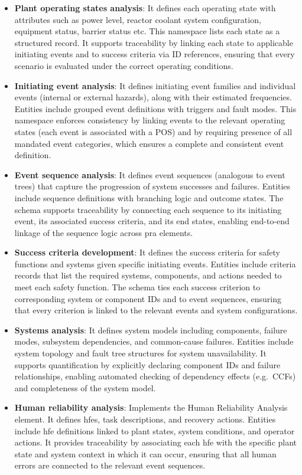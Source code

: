 \begin{itemize}
  \item \textbf{Plant operating states analysis}: It defines each operating state with attributes such as power level, reactor coolant system configuration, equipment status, barrier status etc.  This namespace lists each state as a structured record.  It supports traceability by linking each state to applicable initiating events and to success criteria via ID references, ensuring that every scenario is evaluated under the correct operating conditions.
  \item \textbf{Initiating event analysis}: It defines initiating event families and individual events (internal or external hazards), along with their estimated frequencies.  Entities include grouped event definitions with triggers and fault modes.  This namespace enforces consistency by linking events to the relevant operating states (each event is associated with a POS) and by requiring presence of all mandated event categories, which ensures a complete and consistent event definition.
  \item \textbf{Event sequence analysis}: It defines event sequences (analogous to event trees) that capture the progression of system successes and failures.  Entities include sequence definitions with branching logic and outcome states.  The schema supports traceability by connecting each sequence to its initiating event, its associated success criteria, and its end states, enabling end-to-end linkage of the sequence logic across \acrshort{pra} elements.
  \item \textbf{Success criteria development}: It defines the success criteria for safety functions and systems given specific initiating events.  Entities include criteria records that list the required systems, components, and actions needed to meet each safety function.  The schema ties each success criterion to corresponding system or component IDs and to event sequences, ensuring that every criterion is linked to the relevant events and system configurations.
  \item \textbf{Systems analysis}: It defines system models including components, failure modes, subsystem dependencies, and common-cause failures.  Entities include system topology and fault tree structures for system unavailability.  It supports quantification by explicitly declaring component IDs and failure relationships, enabling automated checking of dependency effects (e.g.\ CCFs) and completeness of the system model.
  \item \textbf{Human reliability analysis}: Implements the Human Reliability Analysis element.  It defines \acrfull{hfe}s, task descriptions, and recovery actions.  Entities include \acrshort{hfe} definitions linked to plant states, system conditions, and operator actions.  It provides traceability by associating each \acrshort{hfe} with the specific plant state and system context in which it can occur, ensuring that all human errors are connected to the relevant event sequences.

\end{itemize}
